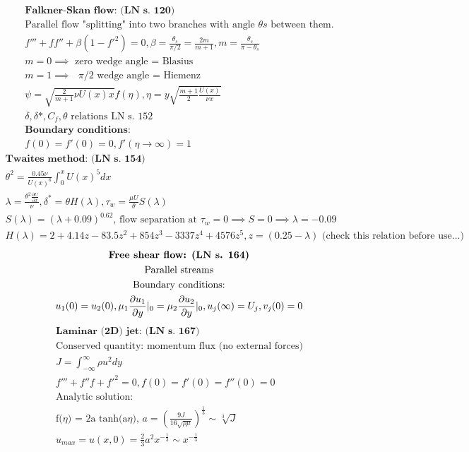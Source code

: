\documentclass[10pt, a4paper]{article}
\newcommand{\derivative}[2]{\frac{\partial #1}{\partial #2}}
\begin{document}
\begin{gather*}
    \textbf{Falkner-Skan flow: (LN s. 120)} \\
    \text{Parallel flow "splitting" into two branches with angle $\theta{s}$ between them.} \\
    f''' + ff'' + \beta(1 - f'^{2}) = 0, \beta = \frac{\theta_s}{\pi/2} = \frac{2m}{m + 1}, m = \frac{\theta_s}{\pi - \theta_s} \\
    m = 0 \implies \text{ zero wedge angle = Blasius} \\
    m = 1 \implies \text{ $\pi$/2 wedge angle = Hiemenz} \\
    \psi = \sqrt{\frac{2}{m+1} \nu U(x) x}f(\eta), \eta = y \sqrt{\frac{m+1}{2}\frac{U(x)}{\nu x}} \\
    \delta, \delta*, C_f, \theta \text{ relations LN s. 152} \\
    \textbf{Boundary conditions:} \\
    f(0) = f'(0) = 0, f'(\eta \rightarrow \infty) = 1 
\end{gather*}
\begin{gather*}
    \textbf{Twaites method: (LN s. 154)} \\
    \theta^2 = \frac{0.45 \nu}{U(x)^6} \int_{0}^{x}U(x)^5dx \\
    \lambda = \frac{\theta^2 \derivative{U}{x}}{\nu}, \delta^* = \theta H (\lambda), \tau_w = \frac{\mu U}{\theta} S(\lambda) \\
    S(\lambda) = (\lambda + 0.09)^{0.62} \text{, flow separation at $\tau_w = 0 \implies S = 0 \implies \lambda = - 0.09$} \\
    H(\lambda) = 2+4.14z - 83.5z^2 + 854z^3 -3337z^4 + 4576z^5, z = (0.25 -\lambda) \text{ (check this relation before use...)}
\end{gather*}
\begin{gather*}
    \textbf{Free shear flow: (LN s. 164)} \\
    \text{Parallel streams} \\
    \text{Boundary conditions:} \\
    u_{1}(0) = u_{2}(0), \mu_{1}\derivative{u_{1}}{y}\arrowvert_{0} = \mu_{2}\derivative{u_{2}}{y}\arrowvert_{0}, u_j(\infty) = U_j, v_j(0) = 0
\end{gather*}
\begin{gather*}
    \textbf{Laminar (2D) jet: (LN s. 167)} \\
    \text{Conserved quantity: momentum flux (no external forces)} \\
    J = \int_{-\infty}^{\infty}\rho u^{2}dy \\
    f''' + f''f + f'^{2} = 0, f(0) = f'(0) = f''(0) = 0 \\
    \text{Analytic solution: } \\
    \text{f($\eta$) = 2a tanh(a$\eta$), $a = (\frac{9J}{16\sqrt{\rho \mu}})^{\frac{1}{3}}\sim\sqrt[3]{J}$} \\
    u_{max} = u(x,0) = \frac{2}{3} a^2x^{-\frac{1}{3}} \sim x^{-\frac{1}{3}}
\end{gather*}
\end{document}
